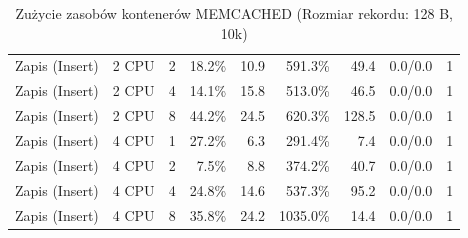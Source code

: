 \begin{table}[ht]
{\begin{tabular}{llcrrrrcc}
Zapis (Insert) & 2 CPU & 2 & 18.2\% & 10.9 & 591.3\% & 49.4 & 0.0/0.0 & 1 \\
Zapis (Insert) & 2 CPU & 4 & 14.1\% & 15.8 & 513.0\% & 46.5 & 0.0/0.0 & 1 \\
Zapis (Insert) & 2 CPU & 8 & 44.2\% & 24.5 & 620.3\% & 128.5 & 0.0/0.0 & 1 \\
Zapis (Insert) & 4 CPU & 1 & 27.2\% & 6.3 & 291.4\% & 7.4 & 0.0/0.0 & 1 \\
Zapis (Insert) & 4 CPU & 2 & 7.5\% & 8.8 & 374.2\% & 40.7 & 0.0/0.0 & 1 \\
Zapis (Insert) & 4 CPU & 4 & 24.8\% & 14.6 & 537.3\% & 95.2 & 0.0/0.0 & 1 \\
Zapis (Insert) & 4 CPU & 8 & 35.8\% & 24.2 & 1035.0\% & 14.4 & 0.0/0.0 & 1 \\
\bottomrule
\end{tabular}%
}
\caption{Zużycie zasobów kontenerów MEMCACHED (Rozmiar rekordu: 128 B, 10k)}
\label{tab:resources_memcached_small_10000}
\end{table}
